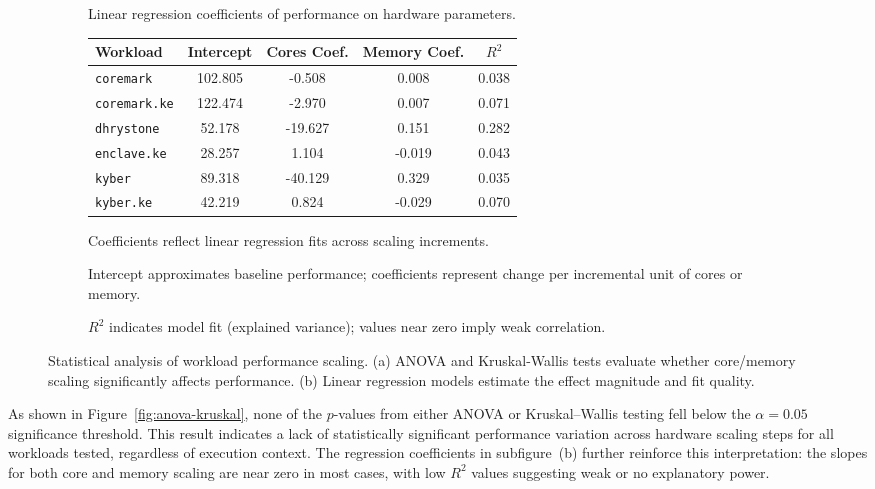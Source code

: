 \begin{figure}[htbp]
\begin{subfigure}[t]{0.9\linewidth}
\centering
\begin{threeparttable}
\caption{Linear regression coefficients of performance on hardware parameters.}
\label{tab:regression-coefs}
\begin{tabular}{@{}l
                S[table-format=7.3]
                S[table-format=7.3]
                S[table-format=7.3]
                S[table-format=7.3]@{}}
\toprule
\textbf{Workload} & \textbf{Intercept} & \textbf{Cores Coef.} & \textbf{Memory Coef.} & \textbf{$R^2$} \\
\midrule
\texttt{coremark}     & 102.805  & -0.508  & 0.008  & 0.038 \\
\texttt{coremark.ke}  & 122.474  & -2.970  & 0.007  & 0.071 \\
\texttt{dhrystone}    & 52.178   & -19.627 & 0.151  & 0.282 \\
\texttt{enclave.ke}   & 28.257   & 1.104   & -0.019 & 0.043 \\
\texttt{kyber}        & 89.318   & -40.129 & 0.329  & 0.035 \\
\texttt{kyber.ke}     & 42.219   & 0.824   & -0.029 & 0.070 \\
\bottomrule
\end{tabular}
\begin{tablenotes}
\footnotesize
\item Coefficients reflect linear regression fits across scaling increments.
\item Intercept approximates baseline performance; coefficients represent change per incremental unit of cores or memory.
\item \( R^2 \) indicates model fit (explained variance); values near zero imply weak correlation.
\end{tablenotes}
\end{threeparttable}
\caption*{}
\end{subfigure}

\caption{Statistical analysis of workload performance scaling. (a) ANOVA and Kruskal-Wallis tests evaluate whether core/memory scaling significantly affects performance. (b) Linear regression models estimate the effect magnitude and fit quality.}
\label{fig:combined-analysis}
\end{figure}

As shown in Figure~\ref{fig:anova-kruskal}, none of the $p$-values from either ANOVA or Kruskal–Wallis testing fell below the $\alpha = 0.05$ significance threshold. This result indicates a lack of statistically significant performance variation across hardware scaling steps for all workloads tested, regardless of execution context. The regression coefficients in subfigure~(b) further reinforce this interpretation: the slopes for both core and memory scaling are near zero in most cases, with low \( R^2 \) values suggesting weak or no explanatory power.


